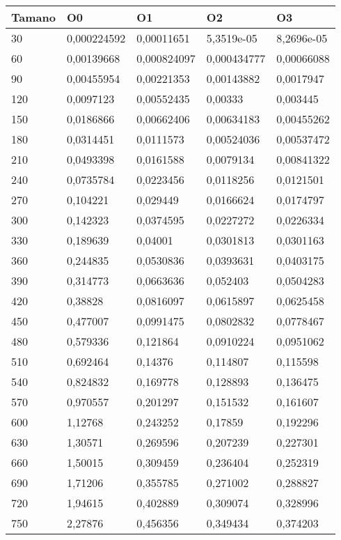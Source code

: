 \begin{tabular}{|l|l|l|l|l|}
	\hline
	Tamano & O0 & O1 & O2 & O3 \\
	\hline
	\hline
	30 & 0,000224592 & 0,00011651 & 5,3519e-05 & 8,2696e-05 \\
	\hline
	60 & 0,00139668 & 0,000824097 & 0,000434777 & 0,00066088 \\
	\hline
	90 & 0,00455954 & 0,00221353 & 0,00143882 & 0,0017947 \\
	\hline
	120 & 0,0097123 & 0,00552435 & 0,00333 & 0,003445 \\
	\hline
	150 & 0,0186866 & 0,00662406 & 0,00634183 & 0,00455262 \\
	\hline
	180 & 0,0314451 & 0,0111573 & 0,00524036 & 0,00537472 \\
	\hline
	210 & 0,0493398 & 0,0161588 & 0,0079134 & 0,00841322 \\
	\hline
	240 & 0,0735784 & 0,0223456 & 0,0118256 & 0,0121501 \\
	\hline
	270 & 0,104221 & 0,029449 & 0,0166624 & 0,0174797 \\
	\hline
	300 & 0,142323 & 0,0374595 & 0,0227272 & 0,0226334 \\
	\hline
	330 & 0,189639 & 0,04001 & 0,0301813 & 0,0301163 \\
	\hline
	360 & 0,244835 & 0,0530836 & 0,0393631 & 0,0403175 \\
	\hline
	390 & 0,314773 & 0,0663636 & 0,052403 & 0,0504283 \\
	\hline
	420 & 0,38828 & 0,0816097 & 0,0615897 & 0,0625458 \\
	\hline
	450 & 0,477007 & 0,0991475 & 0,0802832 & 0,0778467 \\
	\hline
	480 & 0,579336 & 0,121864 & 0,0910224 & 0,0951062 \\
	\hline
	510 & 0,692464 & 0,14376 & 0,114807 & 0,115598 \\
	\hline
	540 & 0,824832 & 0,169778 & 0,128893 & 0,136475 \\
	\hline
	570 & 0,970557 & 0,201297 & 0,151532 & 0,161607 \\
	\hline
	600 & 1,12768 & 0,243252 & 0,17859 & 0,192296 \\
	\hline
	630 & 1,30571 & 0,269596 & 0,207239 & 0,227301 \\
	\hline
	660 & 1,50015 & 0,309459 & 0,236404 & 0,252319 \\
	\hline
	690 & 1,71206 & 0,355785 & 0,271002 & 0,288827 \\
	\hline
	720 & 1,94615 & 0,402889 & 0,309074 & 0,328996 \\
	\hline
	750 & 2,27876 & 0,456356 & 0,349434 & 0,374203 \\
	\hline
\end{tabular}
